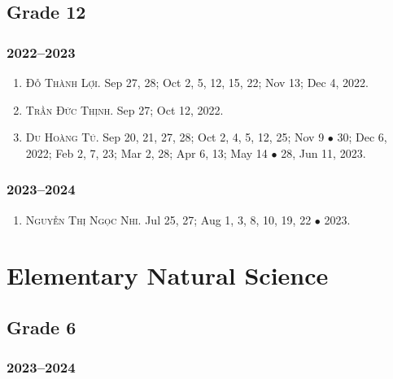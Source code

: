 \documentclass{article}
\begin{document}
\subsection{Grade 12}

\subsubsection{2022--2023}

\begin{enumerate}
	\item \textsc{Đỗ Thành Lợi.} {\sf[In]} Sep 27, 28; Oct 2, 5, 12, 15, 22; Nov 13; Dec 4, 2022. {\sf[Out]}
	\item \textsc{Trần Đức Thịnh.} {\sf[In]} Sep 27; Oct 12, 2022. {\sf[Out]}
	\item \textsc{Du Hoàng Tú.} {\sf[In]} Sep 20, 21, 27, 28; Oct 2, 4, 5, 12, 25; Nov 9 $\bullet$ 30; Dec 6, 2022; Feb 2, 7, 23; Mar 2, 28; Apr 6, 13; May 14 $\bullet$ 28, Jun 11, 2023. {\sf[Out]}
\end{enumerate}

\subsubsection{2023--2024}

\begin{enumerate}
	\item \textsc{Nguyễn Thị Ngọc Nhi.} {\sf[In]} Jul 25, 27; Aug 1, 3, 8, 10, 19, 22 $\bullet$ 2023. {\sf[Out]}
\end{enumerate}


\section{Elementary Natural Science}

\subsection{Grade 6}

\subsubsection{2023--2024}
\end{document}
